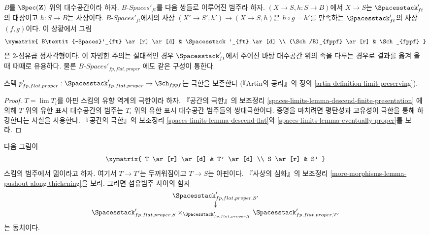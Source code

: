 \begin{remark}
\label{remark-spaces-base-change}
$B$를 $\Spec(\mathbf{Z})$ 위의 대수공간이라 하자.
$B\textit{-Spaces}'_{ft}$를 다음 쌍들로 이루어진 범주라 하자.
$(X \to S, h : S \to B)$에서 $X \to S$는
$\Spacesstack'_{ft}$의 대상이고 $h : S \to B$는 사상이다.
$B\textit{-Spaces}'_{ft}$에서의 사상
$(X' \to S', h') \to (X \to S, h)$은 $h \circ g = h'$를 만족하는
$\Spacesstack'_{ft}$의 사상 $(f, g)$이다. 이 상황에서 그림
$$
\xymatrix{
B\textit{-Spaces}'_{ft} \ar[r] \ar[d] & \Spacesstack'_{ft} \ar[d] \\
(\Sch/B)_{fppf} \ar[r] & \Sch_{fppf}
}
$$
은 $2$-섬유곱 정사각형이다. 이 자명한 주의는 절대적인 경우
$\Spacesstack'_{ft}$에서 주어진 바탕 대수공간 위의 족을 다루는 경우로
결과를 옮겨 올 때 때때로 유용하다. 물론
$B\textit{-Spaces}'_{fp, flat, proper}$
에도 같은 구성이 통한다.
\end{remark}

\begin{lemma}
\label{lemma-spaces-limits}
스택
$p'_{fp, flat, proper} :
\Spacesstack'_{fp, flat, proper} \to \Sch_{fppf}$는 극한을 보존한다
(『Artin의 공리』의 정의 \ref{artin-definition-limit-preserving}).
\end{lemma}

\begin{proof}
$T = \lim T_i$를 아핀 스킴의 유향 역계의 극한이라 하자.
『공간의 극한』의 보조정리
\ref{spaces-limits-lemma-descend-finite-presentation}
에 의해 $T$ 위의 유한 표시 대수공간의 범주는 $T_i$ 위의 유한 표시
대수공간 범주들의 쌍대극한이다. 증명을 마치려면 평탄성과 고유성이 극한을
통해 하강한다는 사실을 사용한다. 『공간의 극한』의 보조정리
\ref{spaces-limits-lemma-descend-flat}와
\ref{spaces-limits-lemma-eventually-proper}를 보라.
\end{proof}

\begin{lemma}
\label{lemma-spaces-RS-star}
다음 그림이
$$
\xymatrix{
T \ar[r] \ar[d] & T' \ar[d] \\
S \ar[r] & S'
}
$$
스킴의 범주에서 밂이라고 하자. 여기서 $T \to T'$는 두꺼워짐이고
$T \to S$는 아핀이다. 『사상의 심화』의 보조정리
\ref{more-morphisms-lemma-pushout-along-thickening}을 보라. 그러면 섬유범주
사이의 함자
$$
\begin{matrix}
\Spacesstack'_{fp, flat, proper, S'} \\
\downarrow \\
\Spacesstack'_{fp, flat, proper, S}
\times_{\Spacesstack'_{fp, flat, proper, T}}
\Spacesstack'_{fp, flat, proper, T'}
\end{matrix}
$$
는 동치이다.
\end{lemma}

